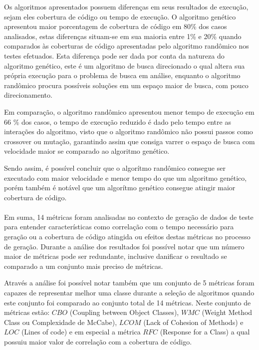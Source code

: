 \documentclass[
	12pt,				%
	oneside,			%
	a4paper,			%
	english,			%
	brazil				%
	]{abntex2ppgsi}
\begin{document}
Os algoritmos apresentados possuem diferenças em seus resultados de execução, sejam eles cobertura de código ou tempo de execução. O algoritmo genético apresentou maior porcentagem de cobertura de código em 80\% dos casos analisados, estas diferenças situam-se em sua maioria entre 1\% e 20\% quando comparados às coberturas de código apresentadas pelo algoritmo randômico nos testes efetuados. Esta diferença pode ser dada por conta da natureza do algoritmo genético, este é um algoritmo de busca direcionado o qual altera sua própria execução para o problema de busca em análise, enquanto o algoritmo randômico procura possíveis soluções em um espaço maior de busca, com pouco direcionamento.

Em comparação, o algoritmo randômico apresentou menor tempo de execução em 66 \% dos casos, o tempo de execução reduzido é dado pelo tempo entre as interações do algoritmo, visto que o algoritmo randômico não possui passos como crossover ou mutação, garantindo assim que consiga varrer o espaço de busca com velocidade maior se comparado ao algoritmo genético.

Sendo assim, é possível concluir que o algorítmo randômico consegue ser executado com maior velocidade e menor tempo do que um algoritmo genético, porém também é notável que um algorítmo genético consegue atingir maior cobertura de código.\\

\\

Em suma, 14 métricas foram analisadas no contexto de geração de dados de teste para entender características como correlação com o tempo necessário para geração ou a cobertura de código atingida ou efeitos destas métricas no processo de geração. Durante a análise dos resultados foi possível notar que um número maior de métricas pode ser redundante, inclusive danificar o resultado se comparado a um conjunto mais preciso de métricas.

Através a análise foi possível notar também que um conjunto de 5 métricas foram capazes de representar melhor uma classe durante a seleção de algoritmos quando este conjunto foi comparado ao conjunto total de 14 métricas. Neste conjunto de métricas estão: $CBO$ (Coupling between Object Classes), $WMC$ (Weight Method Class ou Complexidade de McCabe), $LCOM$ (Lack of Cohesion of Methods) e $LOC$ (Lines of code) e em especial a métrica $RFC$ (Response for a Class) a qual possuiu maior valor de correlação com a cobertura de código.
\end{document}
